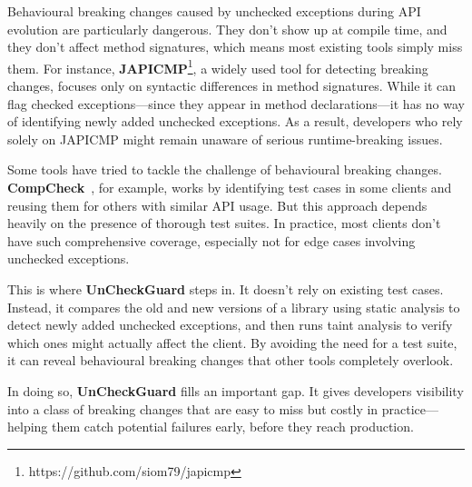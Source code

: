 Behavioural breaking changes caused by unchecked exceptions during API evolution are particularly dangerous. They don’t show up at compile time, and they don’t affect method signatures, which means most existing tools simply miss them. For instance, \textbf{JAPICMP}\footnote{https://github.com/siom79/japicmp}, a widely used tool for detecting breaking changes, focuses only on syntactic differences in method signatures. While it can flag checked exceptions—since they appear in method declarations—it has no way of identifying newly added unchecked exceptions. As a result, developers who rely solely on JAPICMP might remain unaware of serious runtime-breaking issues.

Some tools have tried to tackle the challenge of behavioural breaking changes. \textbf{CompCheck}~\cite{CompCheck}, for example, works by identifying test cases in some clients and reusing them for others with similar API usage. But this approach depends heavily on the presence of thorough test suites. In practice, most clients don’t have such comprehensive coverage, especially not for edge cases involving unchecked exceptions.

This is where \textbf{UnCheckGuard} steps in. It doesn’t rely on existing test cases. Instead, it compares the old and new versions of a library using static analysis to detect newly added unchecked exceptions, and then runs taint analysis to verify which ones might actually affect the client. By avoiding the need for a test suite, it can reveal behavioural breaking changes that other tools completely overlook.

In doing so, \textbf{UnCheckGuard} fills an important gap. It gives developers visibility into a class of breaking changes that are easy to miss but costly in practice—helping them catch potential failures early, before they reach production.
